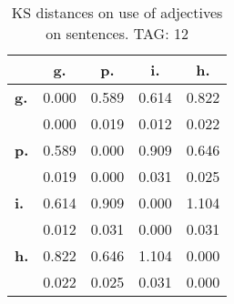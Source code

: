 \begin{table}[h!]
\begin{center}
\begin{tabular}{| l || c | c | c | c |}\hline
 & {\bf g.} & {\bf p.} & {\bf i.} & {\bf h.} \\\hline\hline
{\bf g.} & 0.000 & 0.589 & 0.614 & 0.822 \\
{\bf } & 0.000 & 0.019 & 0.012 & 0.022 \\\hline
{\bf p.} & 0.589 & 0.000 & 0.909 & 0.646 \\
{\bf } & 0.019 & 0.000 & 0.031 & 0.025 \\\hline
{\bf i.} & 0.614 & 0.909 & 0.000 & 1.104 \\
{\bf } & 0.012 & 0.031 & 0.000 & 0.031 \\\hline
{\bf h.} & 0.822 & 0.646 & 1.104 & 0.000 \\
{\bf } & 0.022 & 0.025 & 0.031 & 0.000 \\\hline
\end{tabular}
\caption{KS distances on use of adjectives on sentences. TAG: 12}
\end{center}
\end{table}